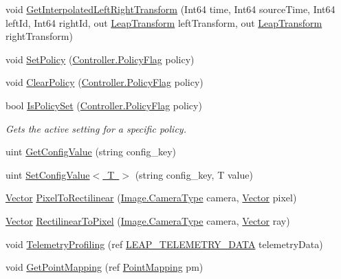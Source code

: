 \begin{DoxyCompactItemize}
\item 
void \mbox{\hyperlink{class_leap_internal_1_1_connection_a038ec58235de9d049bc3a11a07388403}{Get\+Interpolated\+Left\+Right\+Transform}} (Int64 time, Int64 source\+Time, Int64 left\+Id, Int64 right\+Id, out \mbox{\hyperlink{struct_leap_1_1_leap_transform}{Leap\+Transform}} left\+Transform, out \mbox{\hyperlink{struct_leap_1_1_leap_transform}{Leap\+Transform}} right\+Transform)
\item 
void \mbox{\hyperlink{class_leap_internal_1_1_connection_a973bcc5a80165662305ca53cc153ffaf}{Set\+Policy}} (\mbox{\hyperlink{class_leap_1_1_controller_a0bdb49fa94aa2da8b098c1ac296528d6}{Controller.\+Policy\+Flag}} policy)
\item 
void \mbox{\hyperlink{class_leap_internal_1_1_connection_add28c0b2f62ef7b394e194989ad3b424}{Clear\+Policy}} (\mbox{\hyperlink{class_leap_1_1_controller_a0bdb49fa94aa2da8b098c1ac296528d6}{Controller.\+Policy\+Flag}} policy)
\item 
bool \mbox{\hyperlink{class_leap_internal_1_1_connection_a6e2e5ee305e33e8d8c3782708e53b95c}{Is\+Policy\+Set}} (\mbox{\hyperlink{class_leap_1_1_controller_a0bdb49fa94aa2da8b098c1ac296528d6}{Controller.\+Policy\+Flag}} policy)
\begin{DoxyCompactList}\small\item\em Gets the active setting for a specific policy. \end{DoxyCompactList}\item 
uint \mbox{\hyperlink{class_leap_internal_1_1_connection_a3083380baac8141b0d5bdf28a5f0666e}{Get\+Config\+Value}} (string config\+\_\+key)
\item 
uint \mbox{\hyperlink{class_leap_internal_1_1_connection_ae223cb1838efbbe1cb1f65fcd970fe05}{Set\+Config\+Value$<$ T $>$}} (string config\+\_\+key, T value)
\item 
\mbox{\hyperlink{struct_leap_1_1_vector}{Vector}} \mbox{\hyperlink{class_leap_internal_1_1_connection_ac5ddffb50ba506fb3465c8a966beca95}{Pixel\+To\+Rectilinear}} (\mbox{\hyperlink{class_leap_1_1_image_a28310e43e0f2d7f7117e1b45330bdc38}{Image.\+Camera\+Type}} camera, \mbox{\hyperlink{struct_leap_1_1_vector}{Vector}} pixel)
\item 
\mbox{\hyperlink{struct_leap_1_1_vector}{Vector}} \mbox{\hyperlink{class_leap_internal_1_1_connection_ac5c43c1a0c01488e8f67935e9d412117}{Rectilinear\+To\+Pixel}} (\mbox{\hyperlink{class_leap_1_1_image_a28310e43e0f2d7f7117e1b45330bdc38}{Image.\+Camera\+Type}} camera, \mbox{\hyperlink{struct_leap_1_1_vector}{Vector}} ray)
\item 
void \mbox{\hyperlink{class_leap_internal_1_1_connection_a26d1326d5ad65d3ac3daa5bc65e2d367}{Telemetry\+Profiling}} (ref \mbox{\hyperlink{struct_leap_internal_1_1_l_e_a_p___t_e_l_e_m_e_t_r_y___d_a_t_a}{L\+E\+A\+P\+\_\+\+T\+E\+L\+E\+M\+E\+T\+R\+Y\+\_\+\+D\+A\+TA}} telemetry\+Data)
\item 
void \mbox{\hyperlink{class_leap_internal_1_1_connection_ac5abf5861bb14690a4b6c84ca57c9c6e}{Get\+Point\+Mapping}} (ref \mbox{\hyperlink{struct_leap_1_1_point_mapping}{Point\+Mapping}} pm)
\end{DoxyCompactItemize}

